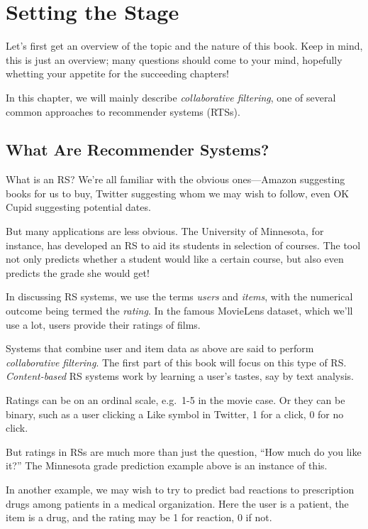 \chapter{Setting the Stage}  
\label{chap:prologue} 

Let's first get an overview of the topic and the nature of this book.
Keep in mind, this is just an overview; many questions should come to
your mind, hopefully whetting your appetite for the succeeding chapters!

In this chapter, we will mainly describe \textit{collaborative
filtering}, one of several common approaches to recommender systems
(RTSs). 

\section{What Are Recommender Systems?}

What is an RS?  We're all familiar with the obvious ones---Amazon
suggesting books for us to buy, Twitter suggesting whom we may wish to
follow, even OK Cupid suggesting potential dates. 

But many applications are less obvious.  The University of Minnesota,
for instance, has developed an RS to aid its students in selection of
courses.  The tool not only predicts whether a student would like a
certain course, but also even predicts the grade she would get!

In discussing RS systems, we use the terms \textit{users} and
\textit{items}, with the numerical outcome being
termed the \textit{rating}.  In the famous MovieLens dataset, which
we'll use a lot, users provide their ratings of films.

Systems that combine user and item data as above are said to perform
\textit{collaborative filtering}.  The first part of this book will
focus on this type of RS.  \textit{Content-based} RS systems work by
learning a user's tastes, say by text analysis.

Ratings can be on an ordinal scale, e.g.\ 1-5 in the movie case.  Or 
they can be binary, such as a user clicking a Like symbol in Twitter, 1 for a
click, 0 for no click.

But ratings in RSs are much more than just the question, ``How much do
you like it?''  The Minnesota grade prediction example above is an
instance of this.

In another example, we may wish to try to predict bad reactions to
prescription drugs among patients in a medical organization.  Here the
user is a patient, the item is a drug, and the rating may be 1 for
reaction, 0 if not.  

